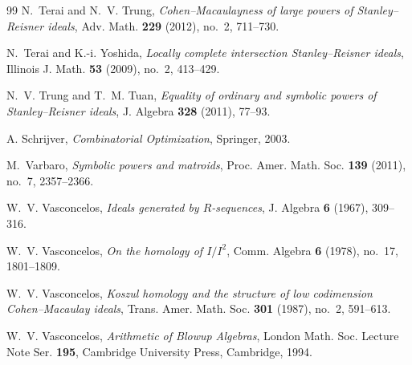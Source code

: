 \documentclass[12pt]{amsart}
\theoremstyle{plain}
\theoremstyle{definition}
\theoremstyle{remark}
\begin{document}
\begin{thebibliography}{99}
N.~Terai and N.~V. Trung,
\emph{Cohen--Macaulayness of large powers of Stanley--Reisner ideals},
Adv. Math. \textbf{229} (2012), no.~2, 711--730.

N.~Terai and K.-i. Yoshida,
\emph{Locally complete intersection Stanley--Reisner ideals},
Illinois J. Math. \textbf{53} (2009), no.~2, 413--429.

N.~V. Trung and T.~M. Tuan,
\emph{Equality of ordinary and symbolic powers of Stanley--Reisner ideals},
J. Algebra \textbf{328} (2011), 77--93.

A. Schrijver, 
\emph{Combinatorial Optimization}, Springer, 2003.

M.~Varbaro,
\emph{Symbolic powers and matroids},
Proc. Amer. Math. Soc. \textbf{139} (2011), no.~7, 2357--2366.

W.~V. Vasconcelos,
\emph{Ideals generated by $R$-sequences},
J. Algebra \textbf{6} (1967), 309--316.

W.~V. Vasconcelos,
\emph{On the homology of $I/I^2$},
Comm. Algebra \textbf{6} (1978), no.~17, 1801--1809.

W.~V. Vasconcelos,
\emph{Koszul homology and the structure of low codimension Cohen--Macaulay ideals},
Trans. Amer. Math. Soc. \textbf{301} (1987), no.~2, 591--613.

W.~V. Vasconcelos,
\emph{Arithmetic of Blowup Algebras},
London Math. Soc. Lecture Note Ser. \textbf{195}, Cambridge University Press,
Cambridge, 1994.

\end{thebibliography}
\end{document}
